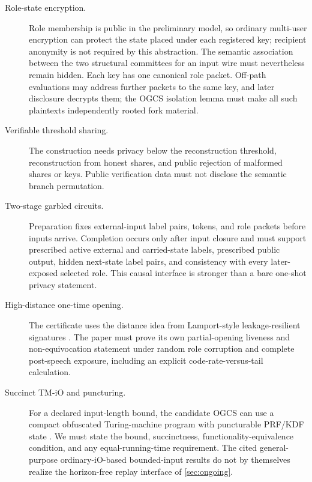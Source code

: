 \begin{description}
  \item[Role-state encryption.] Role membership is public in the preliminary
    model, so ordinary multi-user encryption can protect the state placed
    under each registered key; recipient anonymity is not required by this
    abstraction.  The semantic association between the two structural
    committees for an input wire must nevertheless remain hidden.  Each key
    has one canonical role packet.  Off-path evaluations may address further
    packets to the same key, and later disclosure decrypts them; the OGCS
    isolation lemma must make all such plaintexts independently rooted fork
    material.

  \item[Verifiable threshold sharing.] The construction needs privacy below
    the reconstruction threshold, reconstruction from honest shares, and
    public rejection of malformed shares or keys.  Public verification data
    must not disclose the semantic branch permutation.

  \item[Two-stage garbled circuits.] Preparation fixes external-input label
    pairs, tokens, and role packets before inputs arrive.  Completion occurs
    only after input closure and must support prescribed active external and
    carried-state labels, prescribed public output, hidden next-state label
    pairs, and consistency with every later-exposed selected role.  This
    causal interface is stronger than a bare one-shot privacy statement.

  \item[High-distance one-time opening.] The certificate uses the distance
    idea from Lamport-style leakage-resilient signatures
    \cite{KatzVaikuntanathan2009LeakageSignatures}.  The paper must prove its
    own partial-opening liveness and non-equivocation statement under random
    role corruption and complete post-speech exposure, including an explicit
    code-rate-versus-tail calculation.

  \item[Succinct TM-iO and puncturing.] For a declared input-length bound, the
    candidate OGCS can use a compact obfuscated Turing-machine program with
    puncturable PRF/KDF state
    \cite{KoppulaLewkoWaters2014IOTM,AnanthJainSahai2017TMIO}.  We must state
    the bound, succinctness, functionality-equivalence condition, and any
    equal-running-time requirement.  The cited general-purpose
    ordinary-iO-based bounded-input results do not by themselves realize the
    horizon-free replay interface of \cref{sec:ongoing}.


\end{description}
